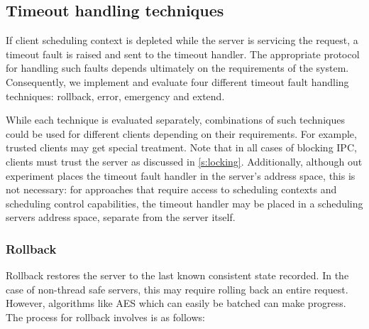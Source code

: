\subsection{Timeout handling techniques}

If client scheduling context is depleted while the server is servicing the request, a timeout fault
is raised and sent to the timeout handler.  The appropriate protocol for handling such faults
depends ultimately on the requirements of the system.  Consequently, we implement and evaluate four
different timeout fault handling techniques: rollback, error, emergency and extend. 

While each technique is evaluated separately, combinations of such techniques could be used for
different clients depending on their requirements. For example, trusted clients may get special
treatment. Note that in all cases of blocking IPC, clients must trust the server as discussed in
\cref{s:locking}. Additionally, although out experiment places 
the timeout fault handler in the server's address
space, this is not necessary: for approaches that require access to scheduling contexts and
scheduling control capabilities, the timeout handler may be placed in a scheduling servers address
space, separate from the server itself.

\subsubsection{Rollback}

Rollback restores the server to the last known consistent state recorded. In the case of non-thread
safe servers, this may require rolling back an entire request. However, algorithms like \gls{AES}
which can easily be batched can make progress. The process for rollback involves is as follows:

